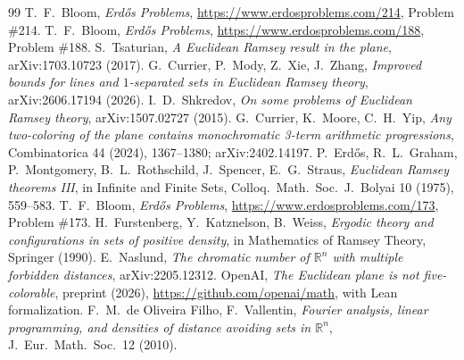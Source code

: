 \documentclass[11pt]{amsart}
\theoremstyle{definition}
\newcommand{\R}{\mathbb{R}}
\begin{document}
\begin{thebibliography}{99}
 T.~F.~Bloom, \emph{Erd\H{o}s Problems}, \url{https://www.erdosproblems.com/214}, Problem \#214.
 T.~F.~Bloom, \emph{Erd\H{o}s Problems}, \url{https://www.erdosproblems.com/188}, Problem \#188.
 S.~Tsaturian, \emph{A Euclidean Ramsey result in the plane}, arXiv:1703.10723 (2017).
 G.~Currier, P.~Mody, Z.~Xie, J.~Zhang, \emph{Improved bounds for lines and $1$-separated sets in Euclidean Ramsey theory}, arXiv:2606.17194 (2026).
 I.~D.~Shkredov, \emph{On some problems of Euclidean Ramsey theory}, arXiv:1507.02727 (2015).
 G.~Currier, K.~Moore, C.~H.~Yip, \emph{Any two-coloring of the plane contains monochromatic 3-term arithmetic progressions}, Combinatorica 44 (2024), 1367--1380; arXiv:2402.14197.
 P.~Erd\H{o}s, R.~L.~Graham, P.~Montgomery, B.~L.~Rothschild, J.~Spencer, E.~G.~Straus, \emph{Euclidean Ramsey theorems III}, in Infinite and Finite Sets, Colloq.\ Math.\ Soc.\ J.\ Bolyai 10 (1975), 559--583.
 T.~F.~Bloom, \emph{Erd\H{o}s Problems}, \url{https://www.erdosproblems.com/173}, Problem \#173.
 H.~Furstenberg, Y.~Katznelson, B.~Weiss, \emph{Ergodic theory and configurations in sets of positive density}, in Mathematics of Ramsey Theory, Springer (1990).
 E.~Naslund, \emph{The chromatic number of $\R^n$ with multiple forbidden distances}, arXiv:2205.12312.
 OpenAI, \emph{The Euclidean plane is not five-colorable}, preprint (2026), \url{https://github.com/openai/math}, with Lean formalization.
 F.~M.~de Oliveira Filho, F.~Vallentin, \emph{Fourier analysis, linear programming, and densities of distance avoiding sets in $\R^n$}, J.\ Eur.\ Math.\ Soc.\ 12 (2010).
\end{thebibliography}
\end{document}

